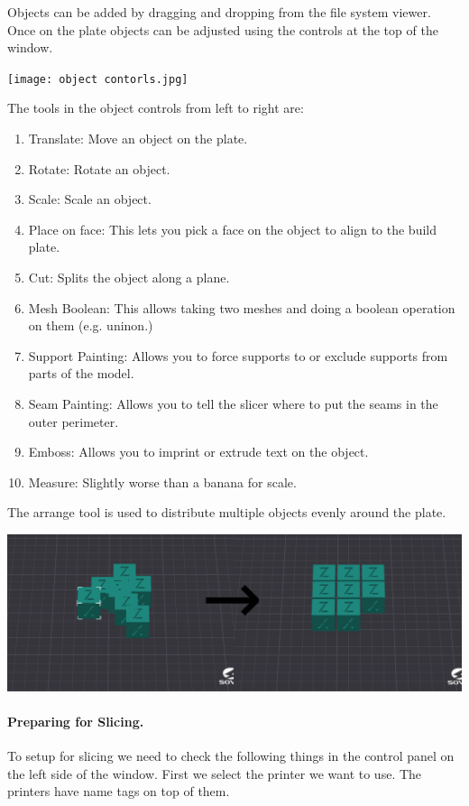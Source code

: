 \documentclass[12pt,legalpaper]{article}
\begin{document}
Objects can be added by dragging and dropping from the file system viewer. Once on the plate objects can be adjusted
using the controls at the top of the window.

\texttt{[image: object contorls.jpg]}

The tools in the object controls from left to right are:
\begin{enumerate}
    \item Translate: Move an object on the plate.
    \item Rotate: Rotate an object.
    \item Scale: Scale an object.
    \item Place on face: This lets you pick a face on the object to align to the build plate.
    \item Cut: Splits the object along a plane.
    \item Mesh Boolean: This allows taking two meshes and doing a boolean operation on them (e.g. uninon.)
    \item Support Painting: Allows you to force supports to or exclude supports from parts of the model.
    \item Seam Painting: Allows you to tell the slicer where to put the seams in the outer perimeter.
    \item Emboss: Allows you to imprint or extrude text on the object.
    \item Measure: Slightly worse than a banana for scale.
\end{enumerate}
The arrange tool is used to distribute multiple objects evenly around the plate.

\includegraphics*{arrange.jpg}

\paragraph{Preparing for Slicing.}
To setup for slicing we need to check the following things in the control panel on the left side of the window.
First we select the printer we want to use. The printers have name tags on top of them.
\end{document}

